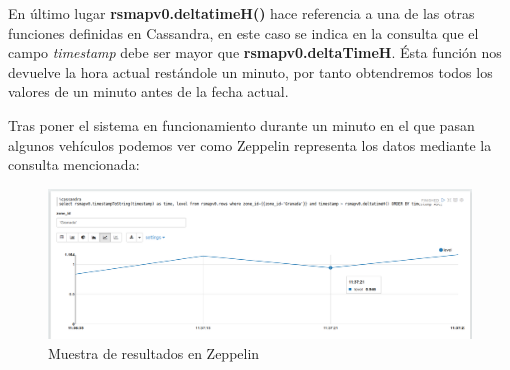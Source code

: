 En último lugar \textbf{rsmapv0.deltatimeH()} hace referencia a una de las otras funciones definidas en Cassandra, en este caso se indica en la consulta que el campo \textit{timestamp} debe ser mayor que \textbf{rsmapv0.deltaTimeH}. Ésta función nos devuelve la hora actual restándole un minuto, por tanto obtendremos todos los valores de un minuto antes de la fecha actual.

\bigskip

Tras poner el sistema en funcionamiento durante un minuto en el que pasan algunos vehículos podemos ver como Zeppelin representa los datos mediante la consulta mencionada:

\begin{figure}[!ht]
  \begin{center}
    \includegraphics[scale=0.30]{../images/zeppelin/4.png}
		\caption{Muestra de resultados en Zeppelin}
    \label{fig:kaa}
	\end{center}
\end{figure}

\newpage
